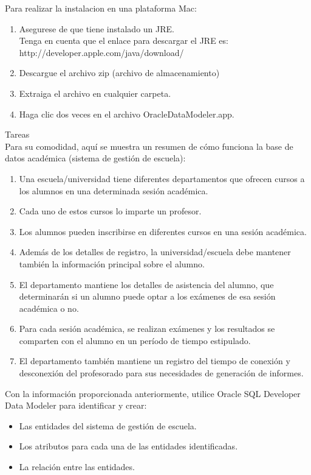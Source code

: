 \documentclass[12pt,letterpaper]{article}
\begin{document}
		Para realizar la instalacion en una plataforma Mac:
\begin{enumerate}[1.]
    \item Asegurese de que tiene instalado un JRE.  \\
    Tenga en cuenta que el enlace para descargar el JRE es: http://developer.apple.com/java/download/
    
   \item Descargue el archivo zip (archivo de almacenamiento)
   
   \item Extraiga el archivo en cualquier carpeta.
   
   \item Haga clic dos veces en el archivo OracleDataModeler.app.

		\end{enumerate}
Tareas\\
Para su comodidad, aquí se muestra un resumen de cómo funciona la base de datos académica (sistema de gestión de escuela):
\begin{enumerate}[1.]
\item Una escuela/universidad tiene diferentes departamentos que ofrecen cursos a los alumnos en una determinada sesión académica.
\item Cada uno de estos cursos lo imparte un profesor.
\item Los alumnos pueden inscribirse en diferentes cursos en una sesión académica.
\item Además de los detalles de registro, la universidad/escuela debe mantener también la información principal sobre el alumno.
\item El departamento mantiene los detalles de asistencia del alumno, que determinarán si un alumno puede optar a los exámenes de esa sesión académica o no.
\item Para cada sesión académica, se realizan exámenes y los resultados se comparten con el alumno en un período de tiempo estipulado.
\item El departamento también mantiene un registro del tiempo de conexión y desconexión del profesorado para sus necesidades de generación de informes.
\end{enumerate}
Con la información proporcionada anteriormente, utilice Oracle SQL Developer Data Modeler para identificar y crear:
\begin{itemize}
    \item Las entidades del sistema de gestión de escuela.
    \item Los atributos para cada una de las entidades identificadas.
    \item La relación entre las entidades.    
\end{itemize}
\end{document}
